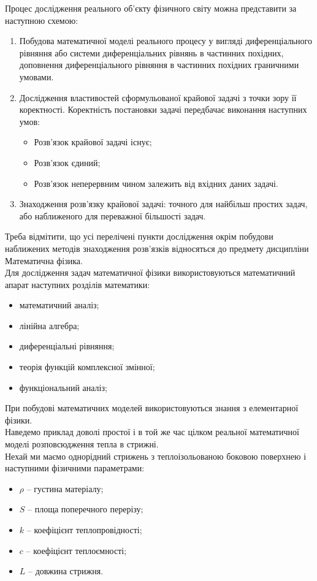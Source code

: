 Процес дослідження реального об’єкту фізичного світу можна представити за наступною схемою:
\begin{enumerate}
	\item Побудова математичної моделі реального процесу у вигляді диференціального рівняння або системи диференціальних рівнянь в частинних похідних, доповнення диференціального рівняння в частинних похідних граничними умовами.
	\item Дослідження властивостей сформульованої крайової задачі з точки зору її коректності. Коректність постановки задачі передбачає виконання наступних умов:
	\begin{itemize}
		\item Розв’язок крайової задачі існує;
		\item Розв’язок єдиний;
		\item Розв’язок неперервним чином залежить від вхідних даних задачі.
	\end{itemize}
	\item Знаходження розв’язку крайової задачі: точного для найбільш простих задач, або наближеного для переважної більшості задач.
\end{enumerate}

Треба відмітити, що усі перелічені пункти дослідження окрім побудови наближених методів знаходження розв’язків відносяться до предмету дисципліни Математична фізика. \\

Для дослідження задач математичної фізики використовуються математичний апарат наступних розділів математики:
\begin{itemize}
	\item математичний аналіз;
	\item лінійна алгебра;
	\item диференціальні рівняння;
	\item теорія функцій комплексної змінної;
	\item функціональний аналіз;
\end{itemize}

При побудові математичних моделей використовуються знання з елементарної фізики. \\

Наведемо приклад доволі простої і в той же час цілком реальної математичної моделі розповсюдження тепла в стрижні. \\

Нехай ми маємо однорідний стрижень з теплоізольованою боковою поверхнею і наступними фізичними параметрами:
\begin{itemize}
	\item $\rho$ -- густина матеріалу;
	\item $S$ -- площа поперечного перерізу;
	\item $k$ -- коефіцієнт теплопровідності;
	\item $c$ -- коефіцієнт теплоємності;
	\item $L$ -- довжина стрижня.
\end{itemize}

